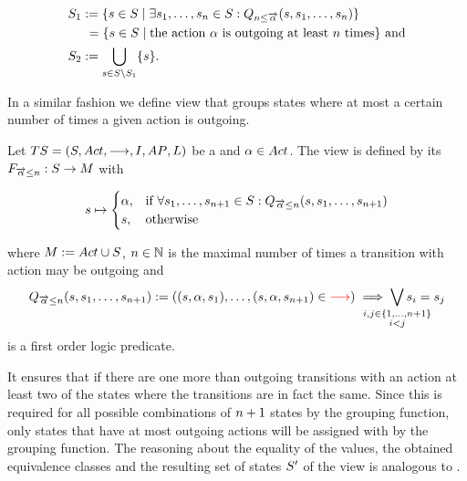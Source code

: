 \documentclass[preview]{standalone}
\begin{document}
\begin{align*}
	\states_1 &:= \{\state \in \states \mid \exists \state_1, \dots, \state_\numoutact \in \states: \predminoutact\} \\ %
	&\hspace{1.15mm}= \{\state \in \states \mid \text{the action } \action \text{ is outgoing at least } \numoutact \text{ times} \} \text{ and} \\
	\states_2 &:= \remstates.	
\end{align*}

In a similar fashion we define view that groups states where at most a certain number of times a given action is outgoing. 

\begin{definition}
	Let ${TS} = {({S}, {Act}, {\longrightarrow}, {I}, {AP}, {L})}$ be a \chosengraphtypeN and ${\alpha} \in {Act}$. The view \viewmaxoutaction is defined by its \grpfctN ${{{{F}}_{{\overrightarrow{{\alpha}}}\leq{n}}}} : {S} \to {M}$ with
	
	\[
	{s} \mapsto
	\begin{cases}
		{\alpha},				& \text{if } \forall {s}_1, \dots, {s}_{{n}+1} \in {S}: {Q_{{\overrightarrow{{\alpha}}}\leq{n}}({s},{s}_1, \dots, {s}_{{n}+1})} \\
		{s},          	& \text{otherwise}
	\end{cases}
	\]
	
	where ${{M}} := {Act} \cup {S}$, ${n} \in {\mathbb{N}}$ is the maximal number of times a transition with action \action may be outgoing and 
	\[
	\predmaxoutact := ((\state, \action, \state_1), \dots, (\state, \action, \state_{\numoutact+1}) \in \redcomment{\transitionrel}) \implies \bigvee_{\mathclap{\substack{i,j \in \{1,\dots, \numoutact+1\} \\ i < j}}} \state_i = \state_j
	\]
	is a first order logic predicate.
	\label{def:viewmaxoutaction}
\end{definition}

 It ensures that if there are one more than \numoutact outgoing transitions with an action \action at least two of the states where the transitions  are in fact the same. Since this is required for all possible combinations of ${n} + 1$ states by the grouping function, only states that have at most \numoutact outgoing actions will be assigned with \action by the grouping function. The reasoning about the equality of the \grpfctN values, the obtained equivalence classes and the resulting set of states ${S}'$ of the view is analogous to \viewminoutaction.
\end{document}
